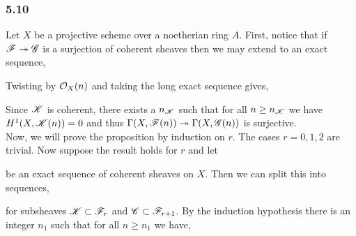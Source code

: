 \documentclass[12pt]{article}
\begin{document}
\subsubsection{5.10}

Let $X$ be a projective scheme over a noetherian ring $A$. First, notice that if $\mathscr{F} \twoheadrightarrow \mathscr{G}$ is a surjection of coherent sheaves then we may extend to an exact sequence,
\begin{center}
\end{center} 
Twisting by $\mathcal{O}_{X}(n)$ and taking the long exact sequence gives,
\begin{center}
\end{center}
Since $\mathscr{K}$ is coherent, there exists a $n_{\mathscr{K}}$ such that for all $n \ge n_{\mathscr{K}}$ we have $H^1(X, \mathscr{K}(n)) = 0$ and thus $\Gamma(X, \mathscr{F}(n)) \twoheadrightarrow \Gamma(X, \mathscr{G}(n))$ is surjective.
\bigskip\\
Now, we will prove the proposition by induction on $r$. The cases $r = 0,1,2$ are trivial. Now suppose the result holds for $r$ and let 
\begin{center}
\end{center}
be an exact sequence of coherent sheaves on $X$.
Then we can split this into sequences,
\begin{center}
\end{center}
for subsheaves $\mathscr{K} \subset \mathscr{F}_r$ and $\mathscr{C} \subset \mathscr{F}_{r+1}$. By the induction hypothesis there is an integer $n_1$ such that for all $n \ge n_1$ we have,
\begin{center}
\end{center}
\end{document}
